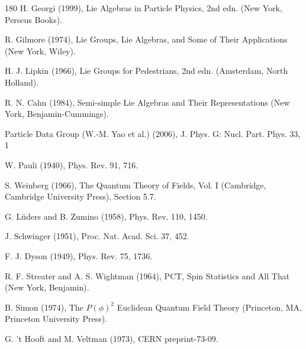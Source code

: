 \begin{thebibliography}{180}
 H. Georgi (1999), Lie Algebras in Particle Physics, 2nd edn. (New York, Perseus Books).

 R. Gilmore (1974), Lie Groups, Lie Algebras, and Some of Their Applications (New York, Wiley).

 H. J. Lipkin (1966), Lie Groups for Pedestrians, 2nd edn. (Amsterdam, North Holland).

 R. N. Cahn (1984), Semi-simple Lie Algebras and Their Representations (New York, Benjamin-Cummings).

 Particle Data Group (W.-M. Yao et al.) (2006), J. Phys. G: Nucl. Part. Phys. 33, 1

 W. Pauli (1940), Phys. Rev. 91, 716.

 S. Weinberg (1966), The Quantum Theory of Fields, Vol. I (Cambridge, Cambridge University Press), Section 5.7.

 G. Lüders and B. Zumino (1958), Phys. Rev. 110, 1450.

 J. Schwinger (1951), Proc. Nat. Acad. Sci. 37, 452.

 F. J. Dyson (1949), Phys. Rev. 75, 1736.

 R. F. Streater and A. S. Wightman (1964), PCT, Spin Statistics and All That (New York, Benjamin).

 B. Simon (1974), The $P(\phi)^2$ Euclidean Quantum Field Theory (Princeton, MA, Princeton University Press).

 G. 't Hooft and M. Veltman (1973), CERN preprint-73-09.


\end{thebibliography}
